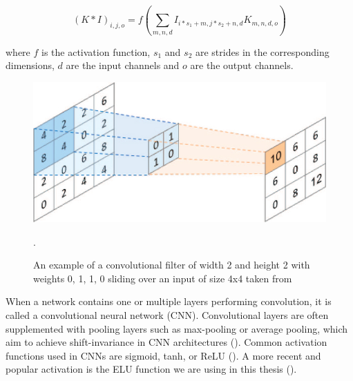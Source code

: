 \begin{equation}
    (K * I)_{i,j,o} = f(\sum_{m,n,d} I_{i*s_1+m,j*s_2+n,d} K_{m,n,d,o})
    \label{eq:convolution}
\end{equation}

where $f$ is the activation function, $s_1$ and $s_2$ are strides in the corresponding dimensions, $d$ are the input channels and $o$ are the output channels.

\begin{figure}[!htpb]
\centering
   \includegraphics[width=0.8\linewidth]{img/ch2/convolution}
   \caption[Convolutional filter]{An example of a convolutional filter of width 2 and height 2 with weights 0, 1, 1, 0 sliding over an input of size 4x4 taken from~\cite{conv-diagram}}.
\label{fig:convolution}
\end{figure}

When a network contains one or multiple layers performing convolution, it is called a convolutional neural network (CNN).
Convolutional layers are often supplemented with pooling layers such as max-pooling or average pooling, which aim to achieve shift-invariance in CNN architectures (\cite{cnn-description}). 
Common activation functions used in CNNs are sigmoid, tanh, or ReLU (\cite{relu-paper}).
A more recent and popular activation is the ELU function we are using in this thesis (\cite{clevert-elu-2016}). 

